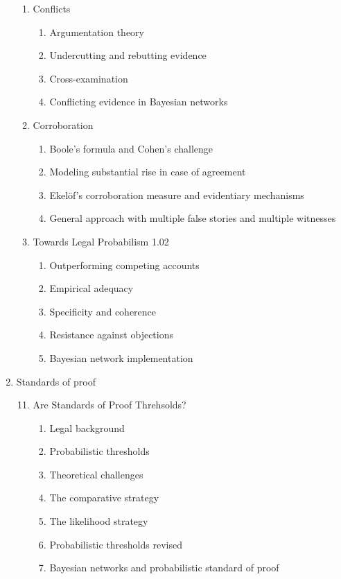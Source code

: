 \documentclass[
  10pt,
  dvipsnames,enabledeprecatedfontcommands]{scrartcl}
\begin{document}
\begin{enumerate}
\begin{enumerate}
  
  \item Conflicts
  \begin{enumerate}
  \item Argumentation theory
  \item Undercutting and rebutting evidence
  \item Cross-examination
  \item Conflicting evidence in Bayesian networks
  \end{enumerate}
 
 
  \item Corroboration
  \begin{enumerate}
  \item Boole's formula and Cohen's challenge
  \item  Modeling substantial rise in case of agreement
  \item Ekel\"of's corroboration measure and evidentiary mechanisms
  \item General approach with multiple false stories and multiple witnesses
  \end{enumerate}


  \item  Towards Legal Probabilism 1.02
    \begin{enumerate}
    \item Outperforming competing accounts
    \item Empirical adequacy
    \item Specificity and coherence
    \item Resistance against objections 
    \item Bayesian network implementation
    \end{enumerate}


\end{enumerate}
\item  Standards of proof
\begin{enumerate}


\setcounter{enumii}{10}
 \item  Are Standards of Proof Threhsolds?
  \begin{enumerate}
  \item  Legal background
  \item  Probabilistic thresholds
  \item  Theoretical challenges
  \item  The comparative strategy
  \item  The likelihood strategy
  \item  Probabilistic thresholds revised
  \item  Bayesian networks and probabilistic standard of proof
  \end{enumerate}



\end{enumerate}
\end{enumerate}
\end{document}
